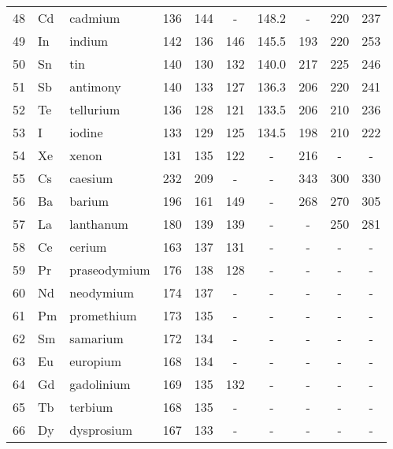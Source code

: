\documentclass[   %
  final,          %
  a4paper,        %
  8pt
]{extarticle}
\begin{document}
\begin{ThreePartTable}
\begin{longtable}{rll*{7}{S[table-format=3.1, table-space-text-post = , table-align-text-post = false]}}
 48  & Cd   & cadmium       & 136   & 144   & {-}   & 148.2 & {-}          & 220        & 237     \\
 49  & In   & indium        & 142   & 136   & 146   & 145.5 & 193 & 220        & 253     \\
 50  & Sn   & tin           & 140   & 130   & 132   & 140.0 & 217 & 225        & 246     \\
 51  & Sb   & antimony      & 140   & 133   & 127   & 136.3 & 206 & 220        & 241     \\
 52  & Te   & tellurium     & 136   & 128   & 121   & 133.5 & 206 & 210        & 236     \\
 53  & I    & iodine        & 133   & 129   & 125   & 134.5 & 198 & 210        & 222     \\
 54  & Xe   & xenon         & 131   & 135   & 122   & {-}   & 216 & {-}        & {-}     \\
 55  & Cs   & caesium       & 232   & 209   & {-}   & {-}   & 343 & 300        & 330     \\
 56  & Ba   & barium        & 196   & 161   & 149   & {-}   & 268 & 270        & 305     \\
 57  & La   & lanthanum     & 180   & 139   & 139   & {-}   & {-}          & 250        & 281     \\
 58  & Ce   & cerium        & 163   & 137   & 131   & {-}   & {-}          & {-}        & {-}     \\
 59  & Pr   & praseodymium  & 176   & 138   & 128   & {-}   & {-}          & {-}        & {-}     \\
 60  & Nd   & neodymium     & 174   & 137   & {-}   & {-}   & {-}          & {-}        & {-}     \\
 61  & Pm   & promethium    & 173   & 135   & {-}   & {-}   & {-}          & {-}        & {-}     \\
 62  & Sm   & samarium      & 172   & 134   & {-}   & {-}   & {-}          & {-}        & {-}     \\
 63  & Eu   & europium      & 168   & 134   & {-}   & {-}   & {-}          & {-}        & {-}     \\
 64  & Gd   & gadolinium    & 169   & 135   & 132   & {-}   & {-}          & {-}        & {-}     \\
 65  & Tb   & terbium       & 168   & 135   & {-}   & {-}   & {-}          & {-}        & {-}     \\
 66  & Dy   & dysprosium    & 167   & 133   & {-}   & {-}   & {-}          & {-}        & {-}     \\

\end{longtable}
\end{ThreePartTable}
\end{document}
